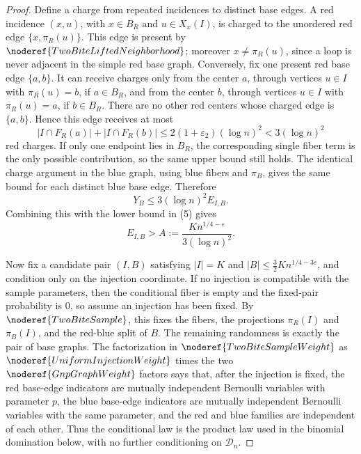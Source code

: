 \begin{proof}
Define a charge from repeated incidences to distinct base edges.  A red
incidence \((x,u)\), with \(x\in B_R\) and \(u\in X_x(I)\), is charged to the
unordered red edge \(\{x,\pi_R(u)\}\).  This edge is present by
\(\noderef{TwoBiteLiftedNeighborhood}\); moreover \(x\ne\pi_R(u)\), since a
loop is never adjacent in the simple red base graph.  Conversely, fix one
present red base edge \(\{a,b\}\).  It can receive charges only from the center
\(a\), through vertices \(u\in I\) with \(\pi_R(u)=b\), if \(a\in B_R\), and
from the center \(b\), through vertices \(u\in I\) with \(\pi_R(u)=a\), if
\(b\in B_R\).  There are no other red centers whose charged edge is
\(\{a,b\}\).  Hence this edge receives at most
\[
|I\cap F_R(a)|+|I\cap F_R(b)|
\le 2(1+\varepsilon_2)(\log n)^2
<3(\log n)^2
\]
red charges.  If only one endpoint lies in \(B_R\), the corresponding single
fiber term is the only possible contribution, so the same upper bound still
holds.  The identical charge argument in the blue graph, using blue fibers and
\(\pi_B\), gives the same bound for each distinct blue base edge.
Therefore
\[
Y_B\le 3(\log n)^2 E_{I,B}. \tag{7}
\]
Combining this with the lower bound in (5) gives
\[
E_{I,B}>
A:=\frac{K n^{1/4-\varepsilon}}{3(\log n)^2}. \tag{8}
\]

Now fix a candidate pair \((I,B)\) satisfying \(|I|=K\) and
\(|B|\le\frac32K n^{1/4-3\varepsilon}\), and condition only on the injection
coordinate.  If no injection is compatible with the sample parameters, then
the conditional fiber is empty and the fixed-pair probability is \(0\), so
assume an injection has been fixed.  By \(\noderef{TwoBiteSample}\), this
fixes the fibers, the projections \(\pi_R(I)\) and \(\pi_B(I)\), and the
red-blue split of \(B\).  The remaining randomness is exactly the pair of base
graphs.  The factorization in \(\noderef{TwoBiteSampleWeight}\) as
\(\noderef{UniformInjectionWeight}\) times the two
\(\noderef{GnpGraphWeight}\) factors says that, after the injection is fixed,
the red base-edge indicators are mutually independent Bernoulli variables with
parameter \(p\), the blue base-edge indicators are mutually independent
Bernoulli variables with the same parameter, and the red and blue families are
independent of each other.  Thus the conditional law is the product law used in
the binomial domination below, with no further conditioning on
\(\mathcal D_n\).


\end{proof}
